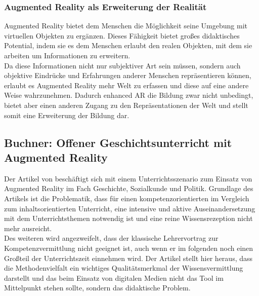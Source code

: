 \subsubsection{Augmented Reality als Erweiterung der Realität}
Augmented Reality bietet dem Menschen die Möglichkeit seine Umgebung mit virtuellen Objekten zu ergänzen. Dieses Fähigkeit bietet großes didaktisches Potential, indem sie es dem Menschen erlaubt den realen Objekten, mit dem sie arbeiten um Informationen zu erweitern.\\
Da diese Informationen nicht nur subjektiver Art sein müssen, sondern auch objektive Eindrücke und Erfahrungen anderer Menschen repräsentieren können, erlaubt es Augmented Reality mehr Welt zu erfassen und diese auf eine andere Weise wahrzunehmen. Dadurch \glqq enhanced\grqq{} AR die Bildung zwar nicht unbedingt, bietet aber einen anderen Zugang zu den Repräsentationen der Welt und stellt somit eine Erweiterung der Bildung dar. \citep[S. 22-23]{damberger:ar-bildungsenhancement}

\subsection{Buchner: Offener Geschichtsunterricht mit Augmented Reality}
Der Artikel \citep{buchner:ar-geschichtsunterricht} von \citeauthor{buchner:ar-geschichtsunterricht} beschäftigt sich mit einem Unterrichtsszenario zum Einsatz von Augmented Reality im Fach Geschichte, Sozialkunde und Politik. 
Grundlage des Artikels ist die Problematik, dass für einen kompetenzorientierten im Vergleich zum inhaltsorientierten Unterricht, eine intensive und aktive Auseinandersetzung mit dem Unterrichtsthemen notwendig ist und eine reine Wissensrezeption nicht mehr ausreicht.\\ 
Des weiteren wird angezweifelt, dass der klassische Lehrervortrag zur Kompetenzvermittlung nicht geeignet ist, auch wenn er im folgenden noch einen Großteil der Unterrichtszeit einnehmen wird. Der Artikel stellt hier heraus, dass die Methodenvielfalt ein wichtiges Qualitätsmerkmal der Wissensvermittlung darstellt und das beim Einsatz von digitalen Medien nicht das Tool im Mittelpunkt stehen sollte, sondern das didaktische Problem.\\

